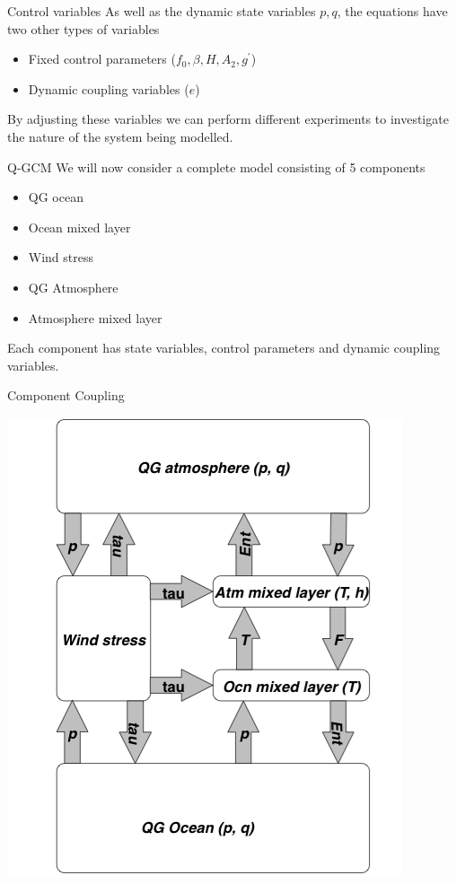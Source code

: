 \documentclass[a4paper]{beamer}
\begin{document}
\begin{frame}{Control variables}
As well as the dynamic state variables $p, q$, the equations have two other types of variables
\begin{itemize}
\item Fixed control parameters ($f_0, \beta, H, A_2, g^\prime$)
\item Dynamic coupling variables ($e$)
\end{itemize}
By adjusting these variables we can perform different experiments to investigate the nature of the system being modelled.
\end{frame}

\begin{frame}{Q-GCM}
We will now consider a complete model consisting of 5 components
\begin{itemize}
\item QG ocean
\item Ocean mixed layer
\item Wind stress
\item QG Atmosphere
\item Atmosphere mixed layer
\end{itemize}
Each component has state variables, control parameters and dynamic coupling variables.
\end{frame}

\begin{frame}{Component Coupling}
  \begin{center}
    \includegraphics[width=\textwidth,height=0.8\textheight,keepaspectratio]{Q-GCM_Block_Diagram.png}
  \end{center}
\end{frame}
\end{document}
